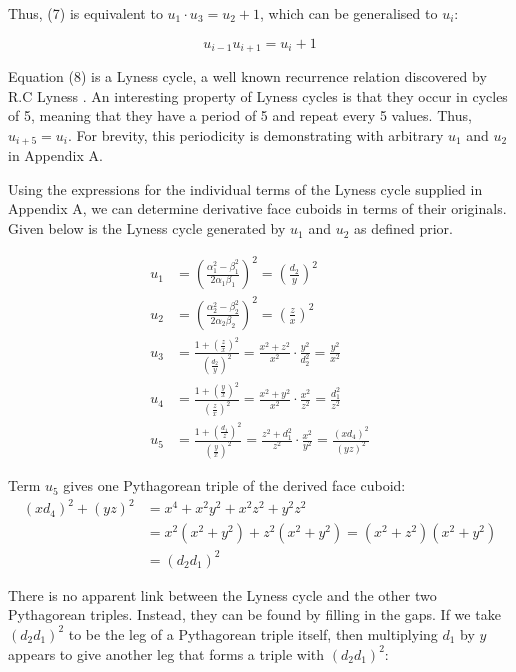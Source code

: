 \documentclass[11pt]{article}
\begin{document}
Thus, (7) is equivalent to $u_1\cdot{u_3}=u_2+1$, which can be generalised to $u_i$:

\begin{equation}
u_{i-1}u_{i+1}=u_i+1
\end{equation}

Equation (8) is a Lyness cycle, a well known recurrence relation discovered by R.C Lyness \cite{lyness}. An interesting property of Lyness cycles is that they occur in cycles of 5, meaning that they have a period of 5 and repeat every 5 values. Thus, $u_{i+5}=u_i$. For brevity, this periodicity is demonstrating with arbitrary $u_1$ and $u_2$ in Appendix A.

Using the expressions for the individual terms of the Lyness cycle supplied in Appendix A, we can determine derivative face cuboids in terms of their originals. Given below is the Lyness cycle generated by $u_1$ and $u_2$ as defined prior.

\begin{equation*}
\begin{aligned}
u_1&=\left(\frac{\alpha_1^2-\beta_1^2}{2\alpha_1\beta_1}\right)^2=\left(\frac{d_2}{y}\right)^2 \\
u_2&=\left(\frac{\alpha_2^2-\beta_2^2}{2\alpha_2\beta_2}\right)^2=\left(\frac{z}{x}\right)^2 \\
u_3&=\frac{1+\left(\frac{z}{x}\right)^2}{\left(\frac{d_2}{y}\right)^2}=\frac{x^2+z^2}{x^2}\cdot\frac{y^2}{d_2^2}=\frac{y^2}{x^2} \\
u_4&=\frac{1+\left(\frac{y}{x}\right)^2}{\left(\frac{z}{x}\right)^2}=\frac{x^2+y^2}{x^2}\cdot\frac{x^2}{z^2}=\frac{d_1^2}{z^2} \\
u_5&=\frac{1+\left(\frac{d_1}{z}\right)^2}{\left(\frac{y}{x}\right)^2}=\frac{z^2+d_1^2}{z^2}\cdot\frac{x^2}{y^2}=\frac{(xd_4)^2}{(yz)^2}
\end{aligned}
\end{equation*}

Term $u_5$ gives one Pythagorean triple of the derived face cuboid:
\begin{equation*}
\begin{aligned}
(xd_4)^2+(yz)^2&=x^4+x^2y^2+x^2z^2+y^2z^2 \\
&=x^2(x^2+y^2)+z^2(x^2+y^2)=(x^2+z^2)(x^2+y^2) \\
&=(d_2d_1)^2
\end{aligned}
\end{equation*}

There is no apparent link between the Lyness cycle and the other two Pythagorean triples. Instead, they can be found by filling in the gaps. If we take $(d_2d_1)^2$ to be the leg of a Pythagorean triple itself, then multiplying $d_1$ by $y$ appears to give another leg that forms a triple with $(d_2d_1)^2$:
\end{document}
